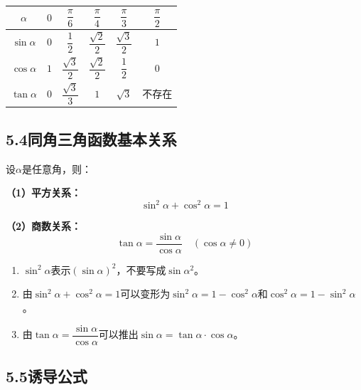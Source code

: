 \documentclass[12pt, a4paper]{ctexart}
\begin{document}
\begin{knowledgebox}[特殊角的三角函数值]
\begin{center}
\begin{tabular}{cccccc}
\toprule
$\alpha$ & $0$ & $\dfrac{\pi}{6}$ & $\dfrac{\pi}{4}$ & $\dfrac{\pi}{3}$ & $\dfrac{\pi}{2}$ \\[6pt]
\midrule
$\sin\alpha$ & $0$ & $\dfrac{1}{2}$ & $\dfrac{\sqrt{2}}{2}$ & $\dfrac{\sqrt{3}}{2}$ & $1$ \\[6pt]
$\cos\alpha$ & $1$ & $\dfrac{\sqrt{3}}{2}$ & $\dfrac{\sqrt{2}}{2}$ & $\dfrac{1}{2}$ & $0$ \\[6pt]
$\tan\alpha$ & $0$ & $\dfrac{\sqrt{3}}{3}$ & $1$ & $\sqrt{3}$ & 不存在 \\
\bottomrule
\end{tabular}
\end{center}
\end{knowledgebox}

\subsection*{5.4\quad 同角三角函数基本关系}

\begin{knowledgebox}[两个基本关系式]
设$\alpha$是任意角，则：

\medskip
\textbf{（1）平方关系：}
\[
  \boxed{\sin^2\alpha+\cos^2\alpha=1}
\]

\textbf{（2）商数关系：}
\[
  \boxed{\tan\alpha=\frac{\sin\alpha}{\cos\alpha}\quad(\cos\alpha\neq0)}
\]
\end{knowledgebox}

\begin{warnbox}[易错提醒]
\begin{enumerate}[leftmargin=2em]
  \item $\sin^2\alpha$表示$(\sin\alpha)^2$，不要写成$\sin\alpha^2$。
  \item 由$\sin^2\alpha+\cos^2\alpha=1$可以变形为$\sin^2\alpha=1-\cos^2\alpha$和$\cos^2\alpha=1-\sin^2\alpha$。
  \item 由$\tan\alpha=\dfrac{\sin\alpha}{\cos\alpha}$可以推出$\sin\alpha=\tan\alpha\cdot\cos\alpha$。
\end{enumerate}
\end{warnbox}

\subsection*{5.5\quad 诱导公式}
\end{document}
